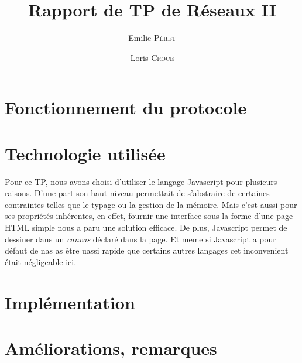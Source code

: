 \documentclass[12pt, a4paper]{article}
\date{}
\title{Rapport de TP de Réseaux II}
\author{Emilie \textsc{Péret} \and Loris \textsc{Croce}}
\begin{document}
\maketitle


\section*{Fonctionnement du protocole}



\section*{Technologie utilisée}

Pour ce TP, nous avons choisi d'utiliser le langage Javascript pour plusieurs raisons. D'une part son haut niveau permettait de s'abstraire de certaines contraintes telles que le typage ou la gestion de la mémoire. Mais c'est aussi pour ses propriétés inhérentes, en effet, fournir une interface sous la forme d'une page HTML simple nous a paru une solution efficace. De plus, Javascript permet de dessiner dans un \emph{canvas} déclaré dans la page.
Et meme si Javascript a pour défaut de nas as être uassi rapide que certains autres langages cet inconvenient était négligeable ici.
\section*{Implémentation}




\section*{Améliorations, remarques}

\end{document}
